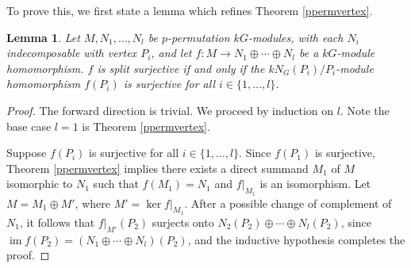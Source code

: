 \documentclass[10pt,letterpaper, boxed, cm]{amsart}
\newcommand{\im}{\operatorname{im}}
\newtheorem{lemma}[theorem]{Lemma}
\theoremstyle{remark}
\theoremstyle{definition}
\begin{document}
	To prove this, we first state a lemma which refines Theorem \ref{ppermvertex}.

	\begin{lemma}
		Let $M,N_1,\dots, N_l$ be $p$-permutation $kG$-modules, with each $N_i$ indecomposable with vertex $P_i$, and let $f: M\to N_1 \oplus\cdots \oplus N_l$ be a $kG$-module homomorphism. $f$ is split surjective if and only if the $kN_G(P_i)/P_i$-module homomorphism $f(P_i)$ is surjective for all $i \in \{1,\dots, l\}$.
	\end{lemma}
	\begin{proof}
		The forward direction is trivial. We proceed by induction on $l$. Note the base case $l = 1$ is Theorem \ref{ppermvertex}.

		Suppose $f(P_i)$ is surjective for all $i \in \{1,\dots, l\}$. Since $f(P_1)$ is surjective, Theorem \ref{ppermvertex} implies there exists a direct summand $M_1$ of $M$ isomorphic to $N_1$ such that $f(M_1) = N_1$ and $f|_{M_1}$ is an isomorphism. Let $M = M_1 \oplus  M'$, where $M' = \ker f|_{M_1}$. After a possible change of complement of $N_1$, it follows that $f|_{M'}(P_2)$ surjects onto $N_2(P_2) \oplus \cdots \oplus N_l(P_2)$, since $\im f(P_2) = (N_1 \oplus \cdots \oplus N_l)(P_2)$, and the inductive hypothesis completes the proof.
	\end{proof}
\end{document}
